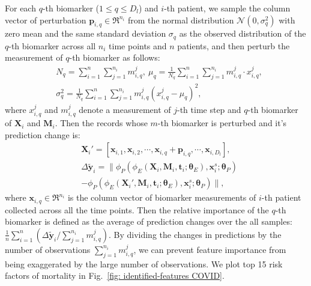 For each $q$-th biomarker ($1 \leq q \leq D_l$) and $i$-th patient, we sample the column vector of perturbation $\mathbf{p}_{i,q} \in \Re^{n_i}$ from the normal distribution $\mathcal{N}(0, \sigma_q^2)$ with zero mean and the same standard deviation $\sigma_q$ as the observed distribution of the $q$-th biomarker across all $n_i$ time points and $n$ patients, and then perturb the measurement of $q$-th biomarker as follows:
\begin{equation}
\begin{aligned}
    &N_q = \sum_{i=1}^n \sum_{j=1}^{n_i} m^j_{i,q},\ \mu_q = \frac{1}{N_q}\sum_{i=1}^n \sum_{j=1}^{n_i} m_{i,q}^j \cdot x_{i,q}^j,\\
    &\sigma_q^2 = \frac{1}{N_q}\sum_{i=1}^n \sum_{j=1}^{n_i} m_{i,q}^j(x_{i,q}^j - \mu_q)^2,
\end{aligned}
\end{equation}
where $x_{i,q}^j$ and $m_{i,q}^j$ denote a measurement of $j$-th time step and $q$-th biomarker of $\mathbf{X}_i$ and $\mathbf{M}_i$.
Then the records whose $m$-th biomarker is perturbed and it's prediction change is:
\begin{equation}
\begin{aligned}
    &\mathbf{X}_i' = [\mathbf{x}_{i, 1}, \mathbf{x}_{i, 2}, \cdots, \mathbf{x}_{i, q} + \mathbf{p}_{i, q}, \cdots, \mathbf{x}_{i, D_l}],\\
    &\Delta\tilde{\mathbf{y}}_i = \| \phi_P(\phi_E(\mathbf{X}_i, \mathbf{M}_i, \mathbf{t}_i; \mathbf{\theta}_E), \mathbf{x}_i^s; \mathbf{\theta}_P)\\
    &- \phi_P(\phi_E(\mathbf{X}_i', \mathbf{M}_i, \mathbf{t}_i; \mathbf{\theta}_E), \mathbf{x}_i^s; \mathbf{\theta}_P) \|,
\end{aligned}
\end{equation}
where $\mathbf{x}_{i, q} \in \Re^{n_i}$ is the column vector of biomarker measurements of $i$-th patient collected across all the time points. Then the relative importance of the $q$-th biomarker is defined as the average of prediction changes over the all samples: $\frac{1}{n}\sum_{i=1}^n (\Delta\tilde{\mathbf{y}}_i / \sum_{j=1}^{n_i} m_{i,q}^j)$. By dividing the changes in predictions by the number of observations $\sum_{j=1}^{n_i} m_{i,q}^j$, we can prevent feature importance from being exaggerated by the large number of observations. We plot top 15 risk factors of mortality in Fig.~\ref{fig: identified-features COVID}.

